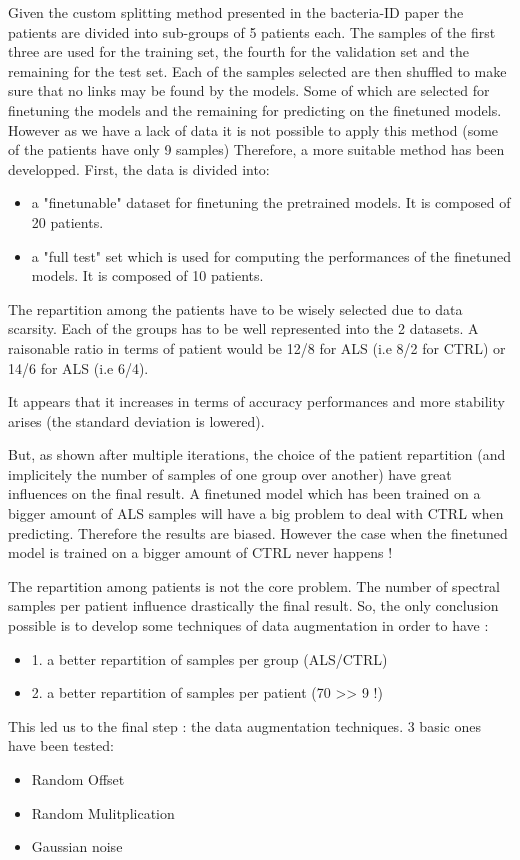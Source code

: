 Given the custom splitting method presented in the bacteria-ID paper the patients are divided into sub-groups of 5 patients each. The samples of the first three are used for the training set, the fourth for the validation set and the remaining for the test set. Each of the samples selected are then shuffled to make sure that no links may be found by the models. Some of which are selected for finetuning the models and the remaining for predicting on the finetuned models.
However as we have a lack of data it is not possible to apply this method (some of the patients have only 9 samples)
Therefore, a more suitable method has been developped. First, the data is divided into:
\begin{itemize}
\item a "finetunable" dataset for finetuning the pretrained models. It is composed of 20 patients.
\item a "full test" set which is used for computing the performances of the finetuned models. It is composed of 10 patients.
\end{itemize}  
The repartition among the patients have to be wisely selected due to data scarsity. Each of the groups has to be well represented into the 2 datasets. 
A raisonable ratio in terms of patient would be 12/8 for ALS (i.e 8/2 for CTRL) or 14/6 for ALS (i.e 6/4). 

It appears that it increases in terms of accuracy performances and more stability arises (the standard deviation is lowered).


But, as shown after multiple iterations, the choice of the patient repartition (and implicitely the number of samples of one group over another) have great influences on the final result.
A finetuned model which has been trained on a bigger amount of ALS samples will have a big problem to deal with CTRL when predicting. Therefore the results are biased. 
However the case when the finetuned model is trained on a bigger amount of CTRL never happens !

The repartition among patients is not the core problem. The number of spectral samples per patient influence drastically the final result. 
So, the only conclusion possible is to develop some techniques of data augmentation in order to have :
\begin{itemize}
\item 1. a better repartition of samples per group (ALS/CTRL)
\item 2. a better repartition of samples per patient (70 >> 9 !)
\end{itemize}
This led us to the final step : the data augmentation techniques.
3 basic ones have been tested:
\begin{itemize}
\item Random Offset
\item Random Mulitplication
\item Gaussian noise
\end{itemize}

